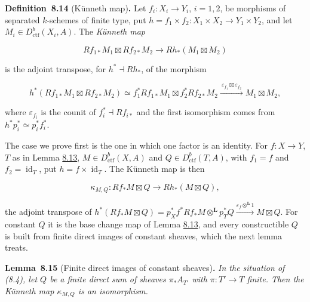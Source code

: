 \documentclass[11pt]{article}
\newenvironment{bpstatement}[2]{\par\addvspace{0.6\baselineskip}\noindent\textbf{#1}#2\textbf{.}\enspace\ignorespaces}
  {\par\addvspace{0.4\baselineskip}}
\newenvironment{bpstatementit}[2]{\begin{bpstatement}{#1}{#2}\itshape\ignorespaces}{\end{bpstatement}}
\begin{document}
\label{bp54}%
\begin{bpstatement}{Definition~8.14}{ (Künneth map)}
Let \(f_i:X_i\to Y_i\), \(i=1,2\), be morphisms of separated \(k\)-schemes of finite type, put \(h=f_1\times f_2:X_1\times X_2\to Y_1\times Y_2\), and let \(M_i\in D^b_{\mathrm{ctf}}(X_i,A)\). The \emph{Künneth map}

\[
Rf_{1*}M_1\boxtimes Rf_{2*}M_2
\longrightarrow Rh_*(M_1\boxtimes M_2)
\tag{8.3}
\]

is the adjoint transpose, for \(h^*\dashv Rh_*\), of the morphism

\[
h^*(Rf_{1*}M_1\boxtimes Rf_{2*}M_2)
\simeq f_1^*Rf_{1*}M_1\boxtimes f_2^*Rf_{2*}M_2
\xrightarrow{\ \varepsilon_{f_1}\boxtimes\varepsilon_{f_2}\ }
M_1\boxtimes M_2,
\]

where \(\varepsilon_{f_i}\) is the counit of \(f_i^*\dashv Rf_{i*}\) and the first isomorphism comes from \(h^*p_i^*\simeq p_i^*f_i^*\).
\end{bpstatement}

\label{bp55}%
The case we prove first is the one in which one factor is an identity. For \(f:X\to Y\), \(T\) as in Lemma \hyperref[bp51]{8.13}, \(M\in D^b_{\mathrm{ctf}}(X,A)\) and \(Q\in D^b_{\mathrm{ctf}}(T,A)\), with \(f_1=f\) and \(f_2=\operatorname{id}_T\), put \(h=f\times\operatorname{id}_T\). The Künneth map is then

\[
\kappa_{M,Q}:Rf_*M\boxtimes Q
\longrightarrow Rh_*(M\boxtimes Q),
\tag{8.4}
\]

the adjoint transpose of \(h^*(Rf_*M\boxtimes Q)=p_X^*f^*Rf_*M\otimes^{\mathbf L} p_T^*Q
\xrightarrow{\varepsilon_f\otimes^{\mathbf L}1}M\boxtimes Q\). For constant \(Q\) it is the base change map of Lemma \hyperref[bp51]{8.13}, and every constructible \(Q\) is built from finite direct images of constant sheaves, which the next lemma treats.

\label{bp56}%
\begin{bpstatementit}{Lemma~8.15}{ (Finite direct images of constant sheaves)}
In the situation of (8.4), let \(Q\) be a finite direct sum of sheaves \(\pi_*A_{T'}\) with \(\pi:T'\to T\) finite. Then the Künneth map \(\kappa_{M,Q}\) is an isomorphism.
\end{bpstatementit}
\end{document}
